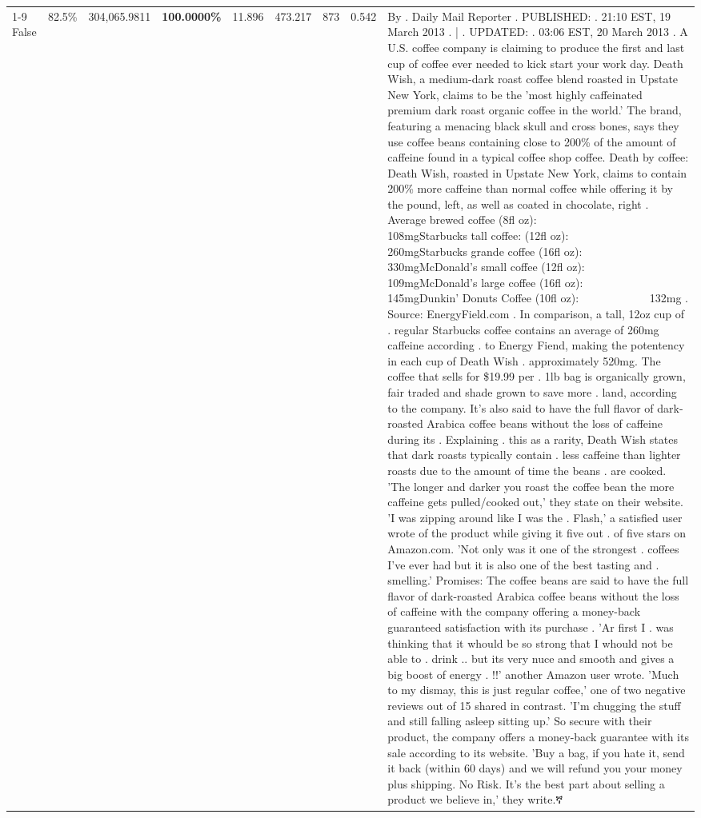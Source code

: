 \begin{table}[H]
{\begin{tabular}{lllrlllll}
\cline{1-9}
False & 82.5\% & 304,065.9811 & \bfseries \color{red} 100.0000\% & 11.896 & 473.217 & 873 & 0.542 & By . Daily Mail Reporter . PUBLISHED: . 21:10 EST, 19 March 2013 . | . UPDATED: . 03:06 EST, 20 March 2013 . A U.S. coffee company is claiming to produce the first and last cup of coffee ever needed to kick start your work day. Death Wish, a medium-dark roast coffee blend roasted in Upstate New York, claims to be the 'most highly caffeinated premium dark roast organic coffee in the world.' The brand, featuring a menacing black skull and cross bones, says they use coffee beans containing close to 200\% of the amount of caffeine found in a typical coffee shop coffee. Death by coffee: Death Wish, roasted in Upstate New York, claims to contain 200\% more caffeine than normal coffee while offering it by the pound, left, as well as coated in chocolate, right . Average brewed coffee (8fl oz):              108mgStarbucks tall coffee: (12fl oz):                260mgStarbucks grande coffee (16fl oz):         330mgMcDonald's small coffee (12fl oz):           109mgMcDonald's large coffee (16fl oz):           145mgDunkin' Donuts Coffee (10fl oz):             132mg . Source: EnergyField.com . In comparison, a tall, 12oz cup of . regular Starbucks coffee contains an average of 260mg caffeine according . to Energy Fiend, making the potentency in each cup of Death Wish . approximately 520mg. The coffee that sells for \$19.99 per . 1lb bag is organically grown, fair traded and shade grown to save more . land, according to the company. It's also said to have the full flavor of dark-roasted Arabica coffee beans without the loss of caffeine during its . Explaining . this as a rarity, Death Wish states that dark roasts typically contain . less caffeine than lighter roasts due to the amount of time the beans . are cooked. 'The longer and darker you roast the coffee bean the more caffeine gets pulled/cooked out,' they state on their website. 'I was zipping around like I was the . Flash,' a satisfied user wrote of the product while giving it five out . of five stars on Amazon.com. 'Not only was it one of the strongest . coffees I've ever had but it is also one of the best tasting and . smelling.’ Promises: The coffee beans are said to have the full flavor of dark-roasted Arabica coffee beans without the loss of caffeine with the company offering a money-back guaranteed satisfaction with its purchase . 'Ar first I . was thinking that it whould be so strong that I whould not be able to . drink .. but its very nuce and smooth and gives a big boost of energy . !!' another Amazon user wrote. 'Much to my dismay, this is just regular coffee,' one of two negative reviews out of 15 shared in contrast. 'I'm chugging the stuff and still falling asleep sitting up.' So secure with their product, the company offers a money-back guarantee with its sale according to its website. 'Buy a bag, if you hate it, send it back (within 60 days) and we will refund you your money plus shipping. No Risk. It’s the best part about selling a product we believe in,' they write.ኛ \\

\end{tabular}}
\end{table}
